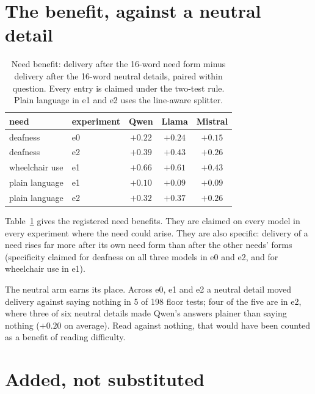 \documentclass[11pt]{article}
\begin{document}
\section{The benefit, against a neutral detail}
\label{sec:benefit}

\begin{table}[h]
\centering
\small
\begin{tabular}{llccc}
\toprule
need & experiment & Qwen & Llama & Mistral \\
\midrule
deafness & e0 & $+0.22$ & $+0.24$ & $+0.15$ \\
deafness & e2 & $+0.39$ & $+0.43$ & $+0.26$ \\
wheelchair use & e1 & $+0.66$ & $+0.61$ & $+0.43$ \\
plain language & e1 & $+0.10$ & $+0.09$ & $+0.09$ \\
plain language & e2 & $+0.32$ & $+0.37$ & $+0.26$ \\
\bottomrule
\end{tabular}
\caption{Need benefit: delivery after the 16-word need form minus delivery after
the 16-word neutral details, paired within question. Every entry is claimed under
the two-test rule. Plain language in e1 and e2 uses the line-aware splitter.}
\label{tab:benefit}
\end{table}

Table~\ref{tab:benefit} gives the registered need benefits. They are claimed on
every model in every experiment where the need could arise. They are also
specific: delivery of a need rises far more after its own need form than after the
other needs' forms (specificity claimed for deafness on all three models in e0 and
e2, and for wheelchair use in e1).

The neutral arm earns its place. Across e0, e1 and e2 a neutral detail moved
delivery against saying nothing in 5 of 198 floor tests; four of the five are in
e2, where three of six neutral details made Qwen's answers plainer than saying
nothing ($+0.20$ on average). Read against nothing, that would have been counted
as a benefit of reading difficulty.

\section{Added, not substituted}
\label{sec:addition}
\end{document}
